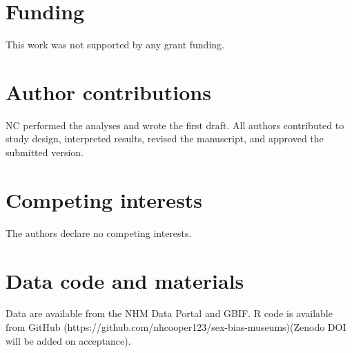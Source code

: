 \documentclass[a4paper, 12pt]{article}
\begin{document}
\section{Funding}
This work was not supported by any grant funding.




\section{Author contributions}
NC performed the analyses and wrote the first draft. All authors contributed to study design, interpreted results, revised the manuscript, and approved the submitted version.

\section{Competing interests}
The authors declare no competing interests.

\section{Data code and materials}\label{data-code-and-materials}
Data are available from the NHM Data Portal \cite{sex-bias-data} and GBIF. 
R code is available from GitHub (https://github.com/nhcooper123/sex-bias-museums)(Zenodo DOI will be added on acceptance).
\end{document}
